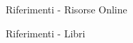 
\begin{frame}{Riferimenti - Risorse Online}
\begin{thebibliography}{99}
%
%
%
%
%

\end{thebibliography}
\end{frame}


\begin{frame}{Riferimenti - Libri}
\begin{thebibliography}{99}
%
%
%
%
	
\end{thebibliography}
\end{frame}